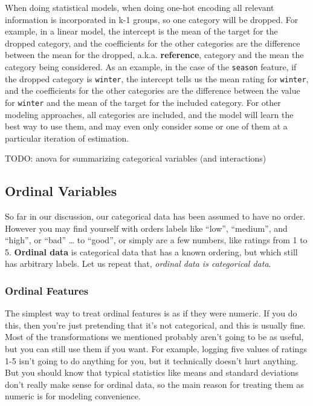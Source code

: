 \documentclass[
  letterpaper,
]{krantz}
\begin{document}
\begin{tcolorbox}[enhanced jigsaw, opacityback=0, leftrule=.75mm, bottomrule=.15mm, colframe=quarto-callout-note-color-frame, rightrule=.15mm, breakable, left=2mm, colback=white, arc=.35mm, toprule=.15mm]

When doing statistical models, when doing one-hot encoding all relevant
information is incorporated in k-1 groups, so one category will be
dropped. For example, in a linear model, the intercept is the mean of
the target for the dropped category, and the coefficients for the other
categories are the difference between the mean for the dropped, a.k.a.
\textbf{reference}, category and the mean the category being considered.
As an example, in the case of the \texttt{season} feature, if the
dropped category is \texttt{winter}, the intercept tells us the mean
rating for \texttt{winter}, and the coefficients for the other
categories are the difference between the value for \texttt{winter} and
the mean of the target for the included category. For other modeling
approaches, all categories are included, and the model will learn the
best way to use them, and may even only consider some or one of them at
a particular iteration of estimation.

\end{tcolorbox}

TODO: anova for summarizing categorical variables (and interactions)

\subsection{Ordinal Variables}\label{sec-data-ordinal}

So far in our discussion, our categorical data has been assumed to have
no order. However you may find yourself with orders labels like ``low'',
``medium'', and ``high'', or ``bad'' \ldots{} to ``good'', or simply are
a few numbers, like ratings from 1 to 5. \textbf{Ordinal data} is
categorical data that has a known ordering, but which still has
arbitrary labels. Let us repeat that, \emph{ordinal data is categorical
data}.

\subsubsection{Ordinal Features}\label{ordinal-features}

The simplest way to treat ordinal features is as if they were numeric.
If you do this, then you're just pretending that it's not categorical,
and this is usually fine. Most of the transformations we mentioned
probably aren't going to be as useful, but you can still use them if you
want. For example, logging five values of ratings 1-5 isn't going to do
anything for you, but it technically doesn't hurt anything. But you
should know that typical statistics like means and standard deviations
don't really make sense for ordinal data, so the main reason for
treating them as numeric is for modeling convenience.
\end{document}
